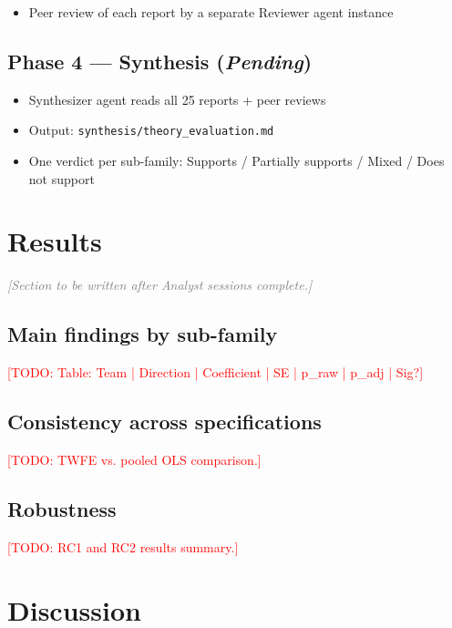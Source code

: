 \documentclass[12pt,a4paper]{article}
\newcommand{\todo}[1]{\textcolor{red}{[TODO: #1]}}
\newcommand{\placeholder}[1]{\textcolor{gray}{\textit{[#1]}}}
\begin{document}
\begin{itemize}
  \item Peer review of each report by a separate Reviewer agent instance
\end{itemize}

\subsection{Phase 4 --- Synthesis (\emph{Pending})}

\begin{itemize}
  \item Synthesizer agent reads all 25 reports + peer reviews
  \item Output: \texttt{synthesis/theory\_evaluation.md}
  \item One verdict per sub-family: Supports / Partially supports / Mixed / Does not support
\end{itemize}

\section{Results}
\label{sec:results}

\placeholder{Section to be written after Analyst sessions complete.}

\subsection{Main findings by sub-family}

\todo{Table: Team | Direction | Coefficient | SE | p\_raw | p\_adj | Sig?}

\subsection{Consistency across specifications}

\todo{TWFE vs. pooled OLS comparison.}

\subsection{Robustness}

\todo{RC1 and RC2 results summary.}

\section{Discussion}
\label{sec:discussion}
\end{document}
